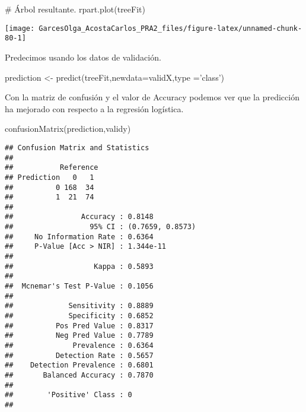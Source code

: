 \documentclass[
]{article}
\newenvironment{Shaded}{\begin{snugshade}}{\end{snugshade}}
\newcommand{\CommentTok}[1]{\textcolor[rgb]{0.50,0.62,0.50}{#1}}
\newcommand{\DataTypeTok}[1]{\textcolor[rgb]{0.87,0.87,0.75}{#1}}
\newcommand{\KeywordTok}[1]{\textcolor[rgb]{0.94,0.87,0.69}{#1}}
\newcommand{\NormalTok}[1]{\textcolor[rgb]{0.80,0.80,0.80}{#1}}
\newcommand{\StringTok}[1]{\textcolor[rgb]{0.80,0.58,0.58}{#1}}
\begin{document}
\begin{Shaded}
\begin{Highlighting}[]
\CommentTok{# Árbol resultante.  }
\KeywordTok{rpart.plot}\NormalTok{(treeFit)}
\end{Highlighting}
\end{Shaded}

\begin{center}\texttt{[image: GarcesOlga\_AcostaCarlos\_PRA2\_files/figure-latex/unnamed-chunk-80-1]} \end{center}

Predecimos usando los datos de validación.

\begin{Shaded}
\begin{Highlighting}[]
\NormalTok{prediction <-}\StringTok{ }\KeywordTok{predict}\NormalTok{(treeFit,}\DataTypeTok{newdata=}\NormalTok{validX,}\DataTypeTok{type =}\StringTok{'class'}\NormalTok{)}
\end{Highlighting}
\end{Shaded}

Con la matriz de confusión y el valor de Accuracy podemos ver que la
predicción ha mejorado con respecto a la regresión logística.

\begin{Shaded}
\begin{Highlighting}[]
\KeywordTok{confusionMatrix}\NormalTok{(prediction,validy)}
\end{Highlighting}
\end{Shaded}

\begin{verbatim}
## Confusion Matrix and Statistics
## 
##           Reference
## Prediction   0   1
##          0 168  34
##          1  21  74
##                                           
##                Accuracy : 0.8148          
##                  95% CI : (0.7659, 0.8573)
##     No Information Rate : 0.6364          
##     P-Value [Acc > NIR] : 1.344e-11       
##                                           
##                   Kappa : 0.5893          
##                                           
##  Mcnemar's Test P-Value : 0.1056          
##                                           
##             Sensitivity : 0.8889          
##             Specificity : 0.6852          
##          Pos Pred Value : 0.8317          
##          Neg Pred Value : 0.7789          
##              Prevalence : 0.6364          
##          Detection Rate : 0.5657          
##    Detection Prevalence : 0.6801          
##       Balanced Accuracy : 0.7870          
##                                           
##        'Positive' Class : 0               
## 
\end{verbatim}
\end{document}
